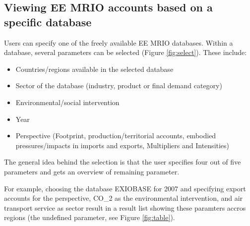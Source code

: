 \subsection{Viewing EE MRIO accounts based on a specific database}

Users can specify one of the freely available EE MRIO databases. 
Within a database, several parameters can be selected (Figure \ref{fig:select}). These include:

\begin{itemize}
    \item Countries/regions available in the selected database
    \item Sector of the database (industry, product or final demand category)
    \item Environmental/social intervention
    \item Year
    \item Perspective (Footprint, production/territorial accounts, embodied
      pressures/impacts in imports and exports, Multipliers and Intensities)
\end{itemize}


The general idea behind the selection is that the user specifies four out
of five parameters and gets an overview of remaining parameter.

For example, choosing the database EXIOBASE for 2007 and specifying export accounts for the perspective, CO_2 as the environmental intervention, and air transport service as sector result in a result list showing these paramters accros regions (the undefined parameter, see Figure \ref{fig:table}).